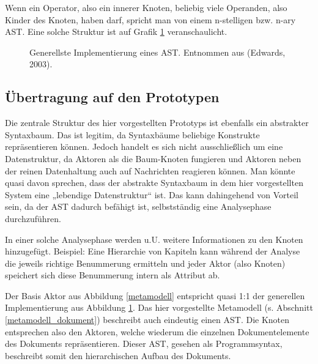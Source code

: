 Wenn ein Operator, also ein innerer Knoten, beliebig viele Operanden, also Kinder des Knoten, haben darf, spricht man von einem n-stelligen bzw. n-ary AST. \citep{Edwards} Eine solche Struktur ist auf Grafik \ref{astimpl} veranschaulicht.

 
\begin{figure}[h!]
\centering
\advance\leftskip-2.5cm
\caption[Generellste Implementierung eines AST]{ Generellste Implementierung eines AST. Entnommen aus (Edwards, 2003). }\label{astimpl}
\end{figure}
 
\subsection{Übertragung auf den Prototypen}\label{}
 
Die zentrale Struktur des hier vorgestellten Prototyps ist ebenfalls ein abstrakter Syntaxbaum. Das ist legitim, da Syntaxbäume beliebige Konstrukte repräsentieren können. Jedoch handelt es sich nicht ausschließlich um eine Datenstruktur, da Aktoren als die Baum-Knoten fungieren und Aktoren neben der reinen Datenhaltung auch auf Nachrichten reagieren können. Man könnte quasi davon sprechen, dass der abstrakte Syntaxbaum in dem hier vorgestellten System eine „lebendige Datenstruktur“ ist. Das kann dahingehend von Vorteil sein, da der AST dadurch befähigt ist, selbstständig eine Analysephase durchzuführen.

 
In einer solche Analysephase werden u.U. weitere Informationen zu den Knoten hinzugefügt. Beispiel: Eine Hierarchie von Kapiteln kann während der Analyse die jeweils richtige Benummerung ermitteln und jeder Aktor (also Knoten) speichert sich diese Benummerung intern als Attribut ab.

 
Der Basis Aktor aus Abbildung \ref{metamodell} entspricht quasi 1:1 der generellen Implementierung aus Abbildung \ref{astimpl}. Das hier vorgestellte Metamodell (s. Abschnitt \ref{metamodell_dokument}) beschreibt auch eindeutig einen AST. Die Knoten entsprechen also den Aktoren, welche wiederum die einzelnen Dokumentelemente des Dokuments repräsentieren. Dieser AST, gesehen als Programmsyntax, beschreibt somit den hierarchischen Aufbau des Dokuments.

